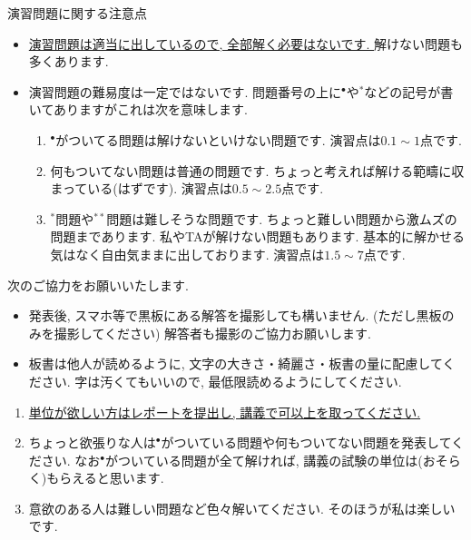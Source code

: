 \documentclass[dvipdfmx,a4paper,11pt]{article}
\theoremstyle{definition}
\begin{document}
演習問題に関する注意点
\begin{itemize}
  \setlength{\parskip}{0cm} 
  \setlength{\itemsep}{0cm} 
\item \underline{演習問題は適当に出しているので, 全部解く必要はないです. } 解けない問題も多くあります.
\item 演習問題の難易度は一定ではないです. 問題番号の上に$^\bullet$や$^*$などの記号が書いてありますがこれは次を意味します.
\begin{enumerate}
  \setlength{\parskip}{0cm} 
  \setlength{\itemsep}{0cm} 
\item $^\bullet$がついてる問題は解けないといけない問題です. 演習点は$0.1\sim1$点です. %
\item 何もついてない問題は普通の問題です. ちょっと考えれば解ける範疇に収まっている(はずです). 演習点は$0.5\sim2.5$点です.
\item $^*$問題や$^{**}$問題は難しそうな問題です. ちょっと難しい問題から激ムズの問題まであります. 私やTAが解けない問題もあります. 基本的に解かせる気はなく自由気ままに出しております. 演習点は$1.5 \sim 7$点です. 
\end{enumerate}
\end{itemize}

次のご協力をお願いいたします.
\begin{itemize}
  \setlength{\parskip}{0cm} 
  \setlength{\itemsep}{0cm} 
\item 発表後, スマホ等で黒板にある解答を撮影しても構いません. (ただし黒板のみを撮影してください) %
解答者も撮影のご協力お願いします.
\item 板書は他人が読めるように, 文字の大きさ・綺麗さ・板書の量に配慮してください. 字は汚くてもいいので, 最低限読めるようにしてください. %
\end{itemize}


\medskip
{}
\begin{enumerate}
  \setlength{\parskip}{0cm} 
  \setlength{\itemsep}{0cm} 
\item \underline{単位が欲しい方はレポートを提出し, 講義で可以上を取ってください.} %
\item ちょっと欲張りな人は$^\bullet$がついている問題や何もついてない問題を発表してください. なお$^{\bullet}$がついている問題が全て解ければ, 講義の試験の単位は(おそらく)もらえると思います.
\item 意欲のある人は難しい問題など色々解いてください. そのほうが私は楽しいです.
\end{enumerate}
\end{document}
